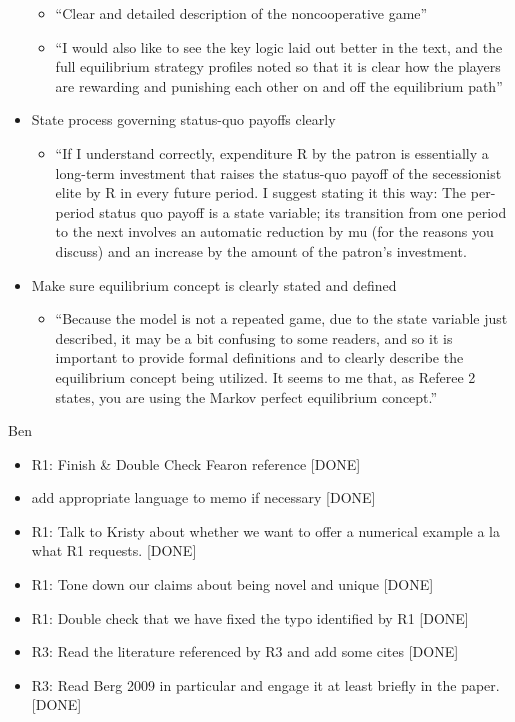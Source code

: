 \documentclass[12pt]{article}
\begin{document}
\begin{itemize}
		\begin{itemize}
			\item ``Clear and detailed description of the noncooperative game''
			\item ``I would also like to see the key logic laid out better in the text, and the full
equilibrium strategy profiles noted so that it is clear how the players are rewarding and punishing each other on and off the equilibrium path''
		\end{itemize}
	\item State process governing status-quo payoffs clearly
		\begin{itemize}
			\item ``If I understand correctly, expenditure R by the patron is essentially a long-term investment that raises the status-quo payoff of the secessionist elite by R in every future period. I suggest stating it this way: The per-period status quo payoff is a state variable; its transition from one period to the next involves an automatic reduction by mu (for the reasons you discuss) and an increase by the amount of the patron's investment.
		\end{itemize}
	\item Make sure equilibrium concept is clearly stated and defined
		\begin{itemize}
			\item ``Because the model is not a repeated game, due to the state variable just described, it may be a bit confusing to some readers, and so it is important to provide formal definitions and to clearly describe the equilibrium concept being utilized. It seems to me that, as Referee 2 states, you are using the Markov perfect equilibrium concept.''
		\end{itemize}
\end{itemize}


Ben
\begin{itemize}
	\item R1: Finish \& Double Check Fearon reference [DONE]
		\item add appropriate language to memo if necessary [DONE]

	\item R1: Talk to Kristy about whether we want to offer a numerical example a la what R1 requests. [DONE]
	
	\item R1: Tone down our claims about being novel and unique [DONE]
	
	\item R1: Double check that we have fixed the typo identified by R1 [DONE]
	
	\item R3: Read the literature referenced by R3 and add some cites [DONE]
	
	\item R3: Read Berg 2009 in particular and engage it at least briefly in the paper. [DONE]

\end{itemize}
\end{document}
